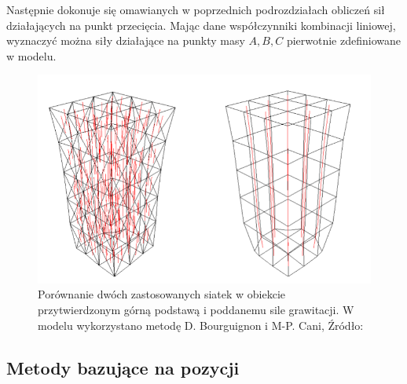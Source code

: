Następnie dokonuje się omawianych w poprzednich podrozdziałach obliczeń sił działających na punkt przecięcia. Mając dane współczynniki kombinacji liniowej, wyznaczyć można siły działające na punkty masy $A,B,C$ pierwotnie zdefiniowane w modelu. 

\begin{figure}[ht]
\centering
\includegraphics[scale=0.5]{images/fixed_anisotropy.png}
\caption{Porównanie dwóch zastosowanych siatek w obiekcie przytwierdzonym górną podstawą i poddanemu sile grawitacji. W modelu wykorzystano metodę D. Bourguignon i M-P. Cani, Źródło: \cite{ca}}
\label{anizotropia-czworoscian-fix}
\end{figure}

\subsection{Metody bazujące na pozycji}
